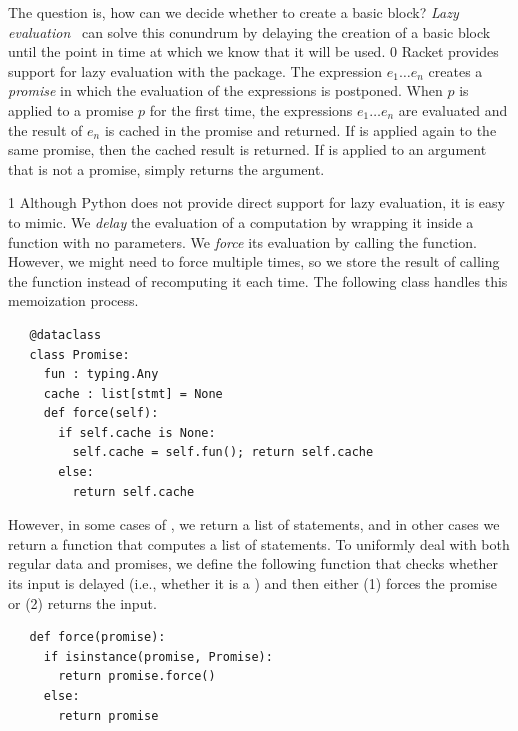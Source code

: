 \documentclass[7x10]{TimesAPriori_MIT}%
\def\racketEd{0}
\def\pythonEd{1}
\providecommand{\BookEdition}{1}
\let\edition\BookEdition
\newcommand{\pythonColor}[0]{}
\numberwithin{theorem}{chapter}
\numberwithin{definition}{chapter}
\numberwithin{equation}{chapter}
\begin{document}
The question is, how can we decide whether to create a basic block?
\emph{Lazy evaluation}~\citep{Friedman:1976aa} can solve this conundrum by
delaying the creation of a basic block until the point in time at which
we know that it will be used.
%
{\if\edition\racketEd
%
Racket provides support for
lazy evaluation with the
\href{https://docs.racket-lang.org/reference/Delayed_Evaluation.html}{}
package. The expression  $e_1 \ldots e_n$\key{)}
 creates a
\emph{promise} in which the evaluation of the
expressions is postponed. When 
$p$\key{)} is applied to a promise $p$ for the
first time, the expressions $e_1 \ldots e_n$ are evaluated and the
result of $e_n$ is cached in the promise and returned. If 
is applied again to the same promise, then the cached result is
returned.  If  is applied to an argument that is not a
promise,  simply returns the argument.
%
\fi}
%
{\if\edition\pythonEd\pythonColor
%
Although Python does not provide direct support for lazy evaluation,
it is easy to mimic. We \emph{delay} the evaluation of a computation
by wrapping it inside a function with no parameters. We \emph{force}
its evaluation by calling the function. However, we might need to
force multiple times, so we store the result of calling the
function instead of recomputing it each time.  The following
 class handles this memoization process.

\begin{minipage}{0.8\textwidth}
\begin{lstlisting}
   @dataclass
   class Promise:
     fun : typing.Any
     cache : list[stmt] = None
     def force(self):
       if self.cache is None:
         self.cache = self.fun(); return self.cache
       else:
         return self.cache
\end{lstlisting}
\end{minipage}

\noindent However, in some cases of , we return
a list of statements, and in other cases we return a function that
computes a list of statements.  To uniformly deal with both regular
data and promises, we define the following  function that
checks whether its input is delayed (i.e., whether it is a
) and then either (1) forces the promise or (2) returns
the input.
%
\begin{lstlisting}
   def force(promise):
     if isinstance(promise, Promise):
       return promise.force()
     else:
       return promise
\end{lstlisting}
%
\fi}
\end{document}
